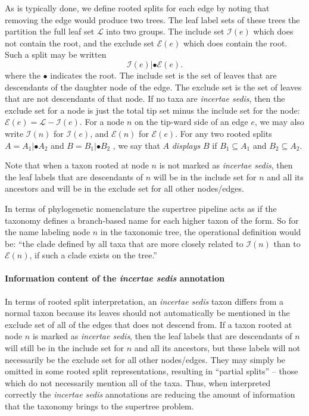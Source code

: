 \documentclass[english]{article}
\begin{document}
As is typically done, we define rooted splits for each edge by noting that
removing the edge would produce two trees. The leaf label sets of these trees
the partition the full leaf set $\mathcal{L}$ into two groups. The include set $\mathcal{I}(e)$ which
does not contain the root, and the exclude set $\mathcal{E}(e)$ which does contain the root.
Such a split may be written
\[ \mathcal{I}(e)|\bullet\mathcal{E}(e).\]
where the $\bullet$ indicates the root. The include set is the set of leaves that are
descendants of the daughter node of the edge. The exclude set is the set of
leaves that are not descendants of that node. If no taxa are \emph{incertae sedis},
then the exclude set for a node is just the total tip set minus the include set
for the node: $\mathcal{E}(e)  =\mathcal{L}-\mathcal{I}(e)$. For a node $n$ on the tip-ward side of an edge $e$, we
may also write $\mathcal{I}(n)$ for $\mathcal{I}(e)$, and $\mathcal{E}(n)$ for $\mathcal{E}(e)$. For any two rooted splits $A=A_{1}|\bullet A_{2}$
and $B=B_{1}|\bullet B_{2}$ , we say that $A$ \emph{displays }$B$ if $B_{1}\subseteq A_{1}$ and $B_{2}\subseteq A_{2}$.

Note that when a taxon rooted at node $n$ is not marked as \emph{incertae sedis},
then the leaf labels that are descendants of $n$ will be in the include set for
$n$ and all its ancestors and will be in the exclude set for all other nodes/edges.

In terms of phylogenetic nomenclature the supertree pipeline acts as if the
taxonomy defines a branch-based name \citep[see][]{deQueiroz2013} for each
higher taxon of the form. So for the name labeling node $n$ in the taxonomic
tree, the operational definition would be: ``the clade defined by all taxa that
are more closely related to $\mathcal{I}(n)$ than to $\mathcal{E}(n)$, if such a clade exists on the tree.''


\paragraph{Information content of the \emph{incertae sedis} annotation}

In terms of rooted split interpretation, an \emph{incertae sedis}
taxon differs from a normal taxon because its leaves should not
automatically be mentioned in the exclude set of all of the edges that
does not descend from.
If a taxon rooted at node $n$ is marked as
\emph{incertae sedis}, then the leaf labels that are descendants of
$n$ will still be in the include set for $n$ and all its ancestors,
but these labels will not necessarily be the exclude set for all other
nodes/edges.
They may simply be omitted in some rooted split
representations, resulting in ``partial splits'' -- those which
do not necessarily mention all of the taxa.
Thus, when interpreted correctly the \emph{incertae sedis} annotations
are reducing the amount of information that the taxonomy brings to
the supertree problem.
\end{document}
